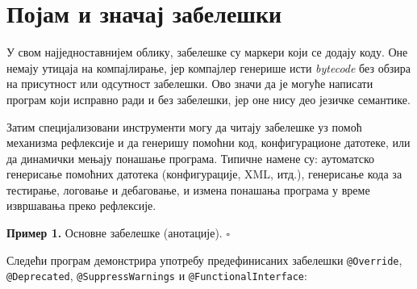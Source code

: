 \section{Појам и значај забелешки}

У свом најједноставнијем облику, забелешке су маркери који се додају коду. Оне немају утицаја на компајлирање, јер компајлер генерише исти \textit{bytecode} без обзира на присутност или одсутност забелешки. Ово значи да је могуће написати програм који исправно ради и без забелешки, јер оне нису део језичке семантике.

Затим специјализовани инструменти могу да читају забелешке уз помоћ механизма рефлексије и да генеришу помоћни код, конфигурационе датотеке, или да динамички мењају понашање програма. Типичне намене су: аутоматско генерисање помоћних датотека (конфигурације, XML, итд.), генерисање кода за тестирање, логовање и дебаговање, и измена понашања програма у време извршавања преко рефлексије.


\bigskip

\noindent \textbf{Пример 1.} Основне забелешке (анотације). $\square$

\medskip

Следећи програм демонстрира употребу предефинисаних забелешки \texttt{@Override}, \texttt{@Deprecated}, \texttt{@SuppressWarnings} и \texttt{@FunctionalInterface}:


